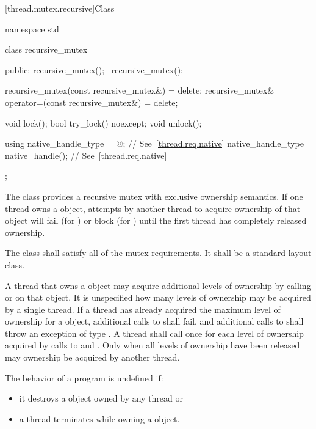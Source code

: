 [thread.mutex.recursive]{Class }

%
\begin{codeblock}
namespace std {
  class recursive_mutex {
  public:
    recursive_mutex();
    ~recursive_mutex();

    recursive_mutex(const recursive_mutex&) = delete;
    recursive_mutex& operator=(const recursive_mutex&) = delete;

    void lock();
    bool try_lock() noexcept;
    void unlock();

    using native_handle_type = @\impdefnc@; // See~\ref{thread.req.native}
    native_handle_type native_handle();                // See~\ref{thread.req.native}
  };
}
\end{codeblock}

\pnum
The class  provides a recursive mutex with exclusive ownership
semantics. If one thread owns a  object, attempts by another
thread to acquire ownership of that object will fail (for ) or block
(for ) until the first thread has completely released ownership.

\pnum
The class  shall satisfy all of the mutex
requirements. It shall be a standard-layout
class.

\pnum
A thread that owns a  object may acquire additional levels of
ownership by calling  or  on that object. It is
unspecified how many levels of ownership may be acquired by a single thread. If a thread
has already acquired the maximum level of ownership for a 
object, additional calls to  shall fail, and additional calls to
 shall throw an exception of type . A thread
shall call  once for each level of ownership acquired by calls to
 and . Only when all levels of ownership have been
released may ownership be acquired by another thread.

\pnum
The behavior of a program is undefined if:

\begin{itemize}
\item it destroys a  object owned by any thread or
\item a thread terminates while owning a  object.
\end{itemize}

